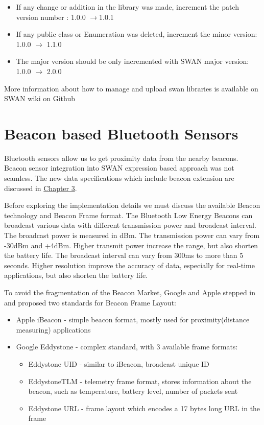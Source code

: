 \begin{itemize}
 \item If any change or addition  in the library was made, increment the patch version number : 1.0.0 $\rightarrow$1.0.1
 \item If any public class or Enumeration was deleted, increment the minor version: 1.0.0 $\rightarrow$ 1.1.0 
 \item The major version should be only incremented with SWAN major version: 1.0.0 $\rightarrow$ 2.0.0
\end{itemize}

More information about how to manage and upload swan libraries is available on SWAN wiki on Github\cite{swanWiki}

\section{Beacon based Bluetooth Sensors}

Bluetooth sensors allow us to get proximity data from the nearby beacons. Beacon sensor integration into SWAN expression based approach was not seamless.
The new data specifications which include beacon extension are discussed in \hyperref[Chapter3]{Chapter 3}.

Before exploring the implementation details we must discuss the available Beacon technology and Beacon Frame format.
The Bluetooth Low Energy Beacons can broadcast various data with different transmission power and broadcast interval.
The broadcast power is measured in dBm\cite{dbiRef}. The transmission power can vary from -30dBm and +4dBm. Higher transmit power
increase the range, but also shorten the battery life. The broadcast interval can vary from 300ms to more than 5 seconds. Higher resolution improve the accuracy of data,
especially for real-time applications, but also shorten the battery life.

To avoid the fragmentation of the Beacon Market, Google and Apple stepped in and proposed two standards for Beacon Frame Layout:
\begin{itemize}
 \item Apple iBeacon - simple beacon format, mostly used for proximity(distance measuring) applications
 \item Google Eddystone - complex standard, with 3 available frame formats:
 \begin{itemize}
  \item Eddystone UID - similar to iBeacon, broadcast unique ID
  \item EddystoneTLM - telemetry frame format, stores information about the beacon, such as temperature, battery level, number of packets sent
  \item Eddystone URL - frame layout which encodes a 17 bytes long URL in the frame
 \end{itemize}
\end{itemize}

